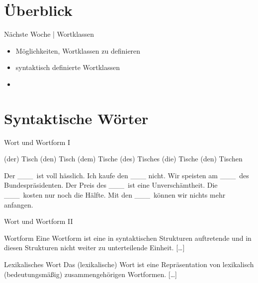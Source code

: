 \section{Überblick}

\begin{frame}
  {Nächste Woche | Wortklassen}
  \begin{itemize}[<+->]
    \item Möglichkeiten, Wortklassen zu definieren
      \Halbzeile
    \item syntaktisch definierte Wortklassen
      \Halbzeile
    \item \citet[Kapitel~6]{Schaefer2018b}
  \end{itemize}
\end{frame}


\section{Syntaktische Wörter}

\begin{frame}
  {Wort und Wortform I}
  \pause
  \begin{exe}
    \ex
    \begin{xlist}
      \ex (der) Tisch
      \pause
      \ex (den) Tisch
      \pause
      \ex (dem) Tisch\alert{e}
      \pause
      \ex (des) Tisch\alert{es}
      \pause
      \ex (die) Tisch\alert{e}
      \pause
      \ex (den) Tisch\alert{en}
    \end{xlist}
  \end{exe}
  \pause
  \begin{exe}
    \ex
    \begin{xlist}
      \ex Der \_\_\_\ ist voll hässlich.
      \pause
      \ex Ich kaufe den \_\_\_ nicht.
      \pause
      \ex Wir speisten am \_\_\_\ des Bundespräsidenten.
      \pause
      \ex Der Preis des \_\_\_\ ist eine Unverschämtheit.
      \pause
      \ex Die \_\_\_\ kosten nur noch die Hälfte.
      \pause
      \ex Mit den \_\_\_\ können wir nichts mehr anfangen.
    \end{xlist}
  \end{exe}
\end{frame}

\begin{frame}
  {Wort und Wortform II}
  \pause
  \begin{block}{Wortform}
    Eine \alert{Wortform} ist eine in syntaktischen Strukturen auftretende und in diesen Strukturen nicht weiter zu unterteilende Einheit.
    [\ldots]
  \end{block}
  \Zeile
  \pause
  \begin{block}{Lexikalisches Wort}
    Das (\alert{lexikalische}) \alert{Wort} ist eine Repräsentation von lexikalisch (bedeutungsmäßig) zusammengehörigen Wortformen.
    [\ldots]
  \end{block}
\end{frame}


